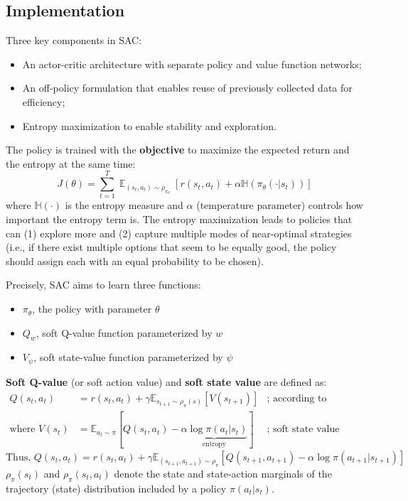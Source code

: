 \documentclass[lang=en,mode=normal,device=normal,color=blue,12pt]{elegantnote}
\DeclareMathOperator*{\1}{\mathbbm{1}}
\DeclareMathOperator*{\E}{\mathbb{E}}
\begin{document}
\subsection{Implementation}

Three key components in SAC:

\begin{itemize}
\item An actor-critic architecture with separate policy and value function networks;
\item An off-policy formulation that enables reuse of previously collected data for efficiency;
\item Entropy maximization to enable stability and exploration.
\end{itemize}

The policy is trained with the \textbf{objective} to maximize the expected return and the entropy at the same time:
\[
J(\theta) = \sum_{t=1}^T \E_{(s_t, a_t) \sim \rho_{\pi_\theta}} [r(s_t, a_t) + \alpha \mathbb{H} (\pi_\theta(\cdot | s_t))]
\]
where $\mathbb{H}(\cdot)$ is the entropy measure and $\alpha$ (temperature parameter) controls how important the entropy term is.
The entropy maximization leads to policies that can (1) explore more and (2) capture multiple modes of near-optimal strategies (i.e., if there exist multiple options that seem to be equally good, the policy should assign each with an equal probability to be chosen).

Precisely, SAC aims to learn three functions:

\begin{itemize}
\item $\pi_\theta$, the policy with parameter $\theta$
\item $Q_w$, soft Q-value function parameterized by $w$
\item $V_\psi$, soft state-value function parameterized by $\psi$
\end{itemize}

\textbf{Soft Q-value} (or soft action value) and \textbf{soft state value} are defined as:
\begin{align*}
Q(s_t, a_t) &= r(s_t, a_t) + \gamma \mathbb{E}_{s_{t+1} \sim \rho_{\pi}(s)} [V(s_{t+1})] & \text{; according to Bellman equation.}\\
\text{where }V(s_t) &= \mathbb{E}_{a_t \sim \pi} [Q(s_t, a_t) - \underbrace{\alpha \log \pi(a_t | s_t)}_\text{entropy}] & \text{; soft state value function.}
\end{align*}
\[
\text{Thus, } Q(s_t, a_t) = r(s_t, a_t) + \gamma \mathbb{E}_{(s_{t+1}, a_{t+1}) \sim \rho_{\pi}} [Q(s_{t+1}, a_{t+1}) - \alpha \log \pi(a_{t+1} \vert s_{t+1})]
\]
$\rho_\pi (s_t)$ and $\rho_\pi(s_t, a_t)$ denote the state and state-action marginals of the trajectory (state) distribution included by a policy $\pi (a_t |s_t)$.
\end{document}
